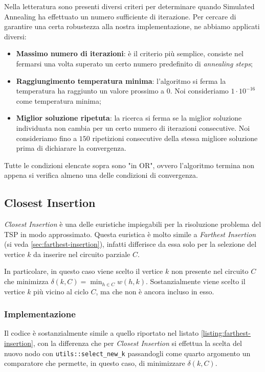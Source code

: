 \noindent Nella letteratura sono presenti diversi criteri per determinare quando Simulated Annealing ha effettuato un numero sufficiente di iterazione. Per cercare di garantire una certa robustezza alla nostra implementazione, ne abbiamo applicati diversi:

\begin{itemize}
    \item \textbf{Massimo numero di iterazioni}: è il criterio più semplice, consiste nel fermarsi una volta superato un certo numero predefinito di \textit{annealing steps};
    \item \textbf{Raggiungimento temperatura minima}: l'algoritmo si ferma la temperatura ha raggiunto un valore prossimo a 0. Noi consideriamo $1 \cdot 10^{-16}$ come temperatura minima;
    \item \textbf{Miglior soluzione ripetuta}: la ricerca si ferma se la miglior soluzione individuata non cambia per un certo numero di iterazioni consecutive. Noi consideriamo fino a $150$ ripetizioni consecutive della stessa migliore soluzione prima di dichiarare la convergenza.
\end{itemize}

\noindent Tutte le condizioni elencate sopra sono "in OR", ovvero l'algoritmo termina non appena si verifica almeno una delle condizioni di convergenza.

\subsection{Closest Insertion}
\label{sec:closest-insertion}

\emph{Closest Insertion} è una delle euristiche impiegabili per la
risoluzione problema del TSP in modo approssimato. Questa euristica
è molto simile a \emph{Farthest Insertion} (si veda \ref{sec:farthest-insertion}),
infatti differisce da essa solo per la selezione del vertice $k$
da inserire nel circuito parziale $C$.

In particolare, in questo caso viene scelto il vertice $k$ non presente
nel circuito $C$ che minimizza $\delta (k, C) = \min_{h \in C} w(h, k)$.
Sostanzialmente viene scelto il vertice $k$ più vicino al ciclo $C$,
ma che non è ancora incluso in esso.

\subsubsection{Implementazione}

Il codice è sostanzialmente simile a quello riportato nel listato
\ref{listing:farthest-insertion}, con la differenza che per
\emph{Closest Insertion} si effettua la scelta del nuovo nodo
con \texttt{utils::select_new_k} passandogli come quarto
argomento un comparatore che permette, in questo caso, di
minimizzare $\delta (k, C)$.

